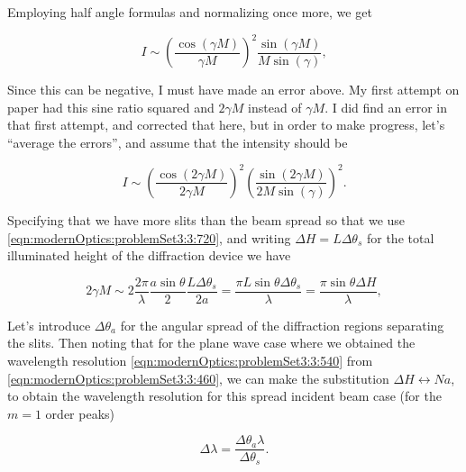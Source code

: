 {Employing half angle formulas and normalizing once more, we get

\begin{dmath}\label{eqn:modernOptics:problemSet3:3:900}
I \sim \left( \frac{\cos( \gamma M )}{\gamma M} \right)^2 \frac{\sin(\gamma M) }{ M \sin( \gamma)},
\end{dmath}

Since this can be negative, I must have made an error above.  My first attempt on paper had this sine ratio squared and $2 \gamma M$ instead of $\gamma M$.  I did find an error in that first attempt, and corrected that here, but in order to make progress, let's ``average the errors'', and assume that the intensity should be

\begin{dmath}\label{eqn:modernOptics:problemSet3:3:920}
I \sim \left( \frac{\cos( 2 \gamma M )}{2 \gamma M} \right)^2
\left( \frac{\sin(2 \gamma M) }{ 2 M \sin( \gamma)} \right)^2.
\end{dmath}

Specifying that we have more slits than the beam spread so that we use \ref{eqn:modernOptics:problemSet3:3:720}, and writing $\Delta H = L \Delta \theta_s$ for the total illuminated height of the diffraction device we have

\begin{dmath}\label{eqn:modernOptics:problemSet3:3:940}
2 \gamma M \sim
2 \frac{2 \pi}{\lambda} \frac{a \sin\theta}{2} \frac{L \Delta \theta_s}{2 a}
=
\frac{\pi L \sin\theta \Delta \theta_s}{\lambda}
=
\frac{\pi \sin\theta \Delta H}{\lambda},
\end{dmath}

Let's introduce $\Delta \theta_a$ for the angular spread of the diffraction regions separating the slits.  Then noting that for the plane wave case where we obtained the wavelength resolution \ref{eqn:modernOptics:problemSet3:3:540} from \ref{eqn:modernOptics:problemSet3:3:460}, we can make the substitution $\Delta H \leftrightarrow N a$, to obtain the wavelength resolution for this spread incident beam case (for the $m = 1$ order peaks)

\begin{dmath}\label{eqn:modernOptics:problemSet3:3:960}
\boxed{
\Delta \lambda = \frac{\Delta \theta_a \lambda}{\Delta \theta_s}.
}
\end{dmath}

}
